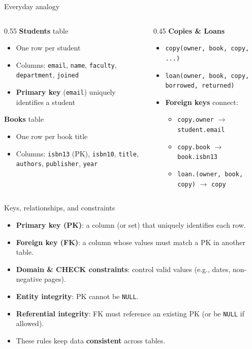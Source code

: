 \documentclass{beamer}
\begin{document}
\begin{frame}{Everyday analogy}
\begin{columns}[T,onlytextwidth]
\begin{column}{0.55\linewidth}
\textbf{Students} table
\begin{itemize}
  \item One row per student
  \item Columns: \texttt{email}, \texttt{name}, \texttt{faculty}, \texttt{department}, \texttt{joined}
  \item \textbf{Primary key} (\texttt{email}) uniquely identifies a student
\end{itemize}
\medskip
\textbf{Books} table
\begin{itemize}
  \item One row per book title
  \item Columns: \texttt{isbn13} (PK), \texttt{isbn10}, \texttt{title}, \texttt{authors}, \texttt{publisher}, \texttt{year}
\end{itemize}
\end{column}
\begin{column}{0.45\linewidth}
\textbf{Copies \& Loans}
\begin{itemize}
  \item \texttt{copy(owner, book, copy, ...)}
  \item \texttt{loan(owner, book, copy, borrowed, returned)}
  \item \textbf{Foreign keys} connect:
  \begin{itemize}
    \item \texttt{copy.owner} $\to$ \texttt{student.email}
    \item \texttt{copy.book} $\to$ \texttt{book.isbn13}
    \item \texttt{loan.(owner, book, copy)} $\to$ \texttt{copy}
  \end{itemize}
\end{itemize}
\end{column}
\end{columns}
\end{frame}

\begin{frame}{Keys, relationships, and constraints}
\begin{itemize}
  \item \textbf{Primary key (PK)}: a column (or set) that uniquely identifies each row.
  \item \textbf{Foreign key (FK)}: a column whose values must match a PK in another table.
  \item \textbf{Domain \& CHECK constraints}: control valid values (e.g., dates, non-negative pages).
  \item \textbf{Entity integrity}: PK cannot be \texttt{NULL}.
  \item \textbf{Referential integrity}: FK must reference an existing PK (or be \texttt{NULL} if allowed).
  \item These rules keep data \textbf{consistent} across tables.
\end{itemize}
\end{frame}
\end{document}
